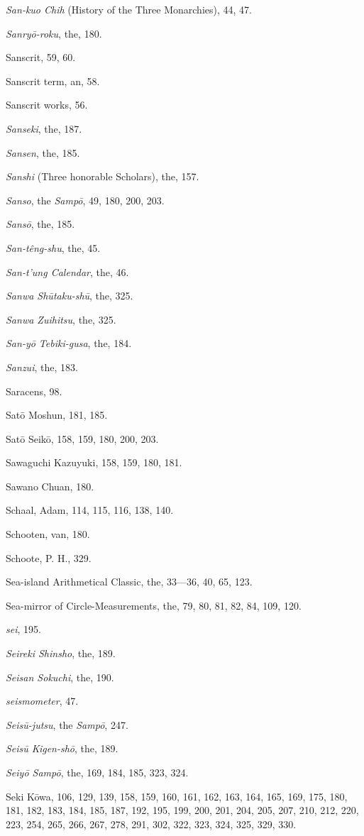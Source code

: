 \documentclass[11pt]{article}
\begin{document}
\emph{San-kuo Chih} (History of the Three Monarchies), 44, 47.\par
\emph{Sanryō-roku}, the, 180.\par
Sanscrit, 59, 60.\par
Sanscrit term, an, 58.\par
Sanscrit works, 56.\par
\emph{Sanseki}, the, 187.\par
\emph{Sansen}, the, 185.\par
\emph{Sanshi} (Three honorable Scholars), the, 157.\par
\emph{Sanso}, the \emph{Sampō}, 49, 180, 200, 203.\par
\emph{Sansō}, the, 185.\par
\emph{San-têng-shu}, the, 45.\par
\emph{San-t'ung Calendar}, the, 46.\par
\emph{Sanwa Shūtaku-shū}, the, 325.\par
\emph{Sanwa Zuihitsu}, the, 325.\par
\emph{San-yō Tebiki-gusa}, the, 184.\par
\emph{Sanzui}, the, 183.\par
Saracens, 98.\par
Satō Moshun, 181, 185.\par
Satō Seikō, 158, 159, 180, 200, 203.\par
Sawaguchi Kazuyuki, 158, 159, 180, 181.\par
Sawano Chuan, 180.\par
Schaal, Adam, 114, 115, 116, 138, 140.\par
Schooten, van, 180.\par
Schoote, P. H., 329.\par
Sea-island Arithmetical Classic, the, 33—36, 40, 65, 123.\par
Sea-mirror of Circle-Measurements, the, 79, 80, 81, 82, 84, 109, 120.\par
\emph{sei}, 195.\par
\emph{Seireki Shinsho}, the, 189.\par
\emph{Seisan Sokuchi}, the, 190.\par
\emph{seismometer}, 47.\par
\emph{Seisū-jutsu}, the \emph{Sampō}, 247.\par
\emph{Seisū Kigen-shō}, the, 189.\par
\emph{Seiyō Sampō}, the, 169, 184, 185, 323, 324.\par
Seki Kōwa, 106, 129, 139, 158, 159, 160, 161, 162, 163, 164, 165, 169, 175, 180, 181, 182, 183, 184, 185, 187, 192, 195, 199, 200, 201, 204, 205, 207, 210, 212, 220, 223, 254, 265, 266, 267, 278, 291, 302, 322, 323, 324, 325, 329, 330.\par
\end{document}
